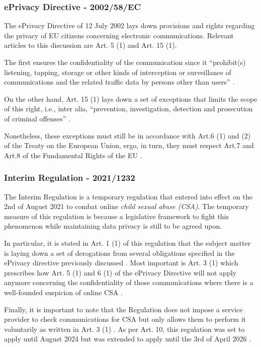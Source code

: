 \subsubsection{ePrivacy Directive - 2002/58/EC}
\label{sss:ePrivacy}

The ePrivacy Directive of 12 July 2002 lays down provisions and rights regarding the privacy of EU citizens concerning electronic communications. Relevant articles to this discussion are Art. 5 (1) and Art. 15 (1).

The first ensures the confidentiality of the communication since it ``prohibit(s) listening, tapping, storage or other kinds of interception or surveillance of communications and the related traffic data by persons other than users'' \cite{ePrivacy}. 

On the other hand, Art. 15 (1) lays down a set of exceptions that limits the scope of this right, i.e., inter alia, ``prevention, investigation, detection and prosecution of criminal offenses'' \cite{ePrivacy}. 

Nonetheless, these exceptions must still be in accordance with Art.6 (1) and (2) of the Treaty on the European Union, ergo, in turn, they must respect Art.7 and Art.8 of the Fundamental Rights of the EU \cite{ePrivacy} \cite{eu_charter_fundamental_rights} \cite{teu}.

\subsubsection{Interim Regulation - 2021/1232}

The Interim Regulation is a temporary regulation that entered into effect on the 2nd of August 2021 to combat online \textit{child sexual abuse (CSA)}. The temporary measure of this regulation is because a legislative framework to fight this phenomenon while maintaining data privacy is still to be agreed upon.

In particular, it is stated in Art. 1 (1) of this regulation that the subject matter is laying down a set of derogations from several obligations specified in the ePrivacy directive previously discussed \cite {interim_regualtion}. Most important is Art. 3 (1) which prescribes how Art. 5 (1) and 6 (1) of the ePrivacy Directive will not apply anymore concerning the confidentiality of those communications where there is a well-founded suspicion of online CSA \cite {interim_regualtion}.

Finally, it is important to note that the Regulation does not impose a service provider to check communications for CSA but only allows them to perform it voluntarily as written in Art. 3 (1) \cite {interim_regualtion}. As per Art. 10, this regulation was set to apply until August 2024 but was extended to apply until the 3rd of April 2026 \cite {interim_regualtion}.

